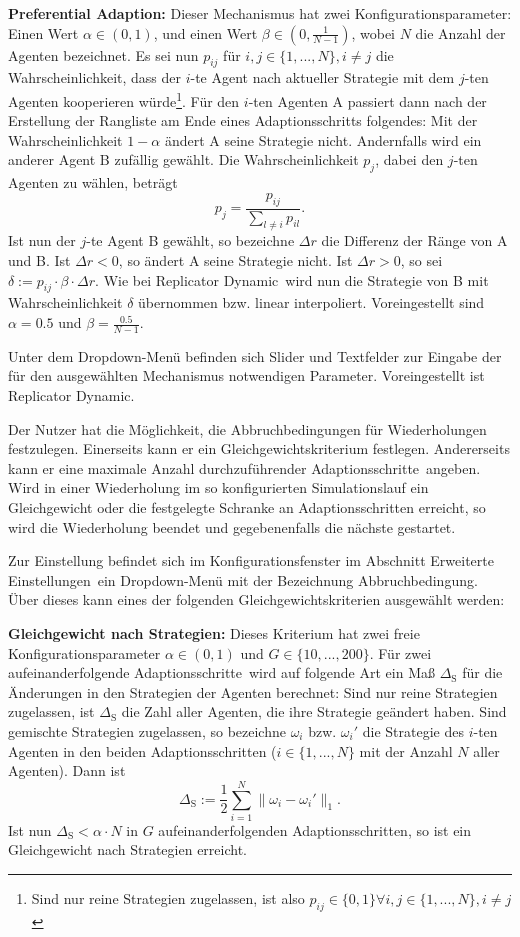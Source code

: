 \documentclass[parskip=full,11pt]{scrartcl}
\def\adapt{Adaptionsschritt}
\def\adapts{Adaptionsschritte}
\begin{document}
\textbf{Preferential Adaption:}
Dieser Mechanismus hat zwei Konfigurationsparameter: Einen Wert \(\alpha \in (0,1)\), und einen Wert \(\beta \in (0,\frac{1}{N-1})\), wobei \(N\) die Anzahl der Agenten bezeichnet. Es sei nun \(p_{ij}\) für \(i,j \in \{1,...,N\}, i \neq j\) die Wahrscheinlichkeit, dass der \(i\)-te Agent nach aktueller Strategie mit dem \(j\)-ten Agenten kooperieren würde\footnote{Sind nur reine Strategien zugelassen, ist also \(p_{ij} \in \{0,1\} \forall i,j \in \{1,...,N\}, i \neq j\)}. Für den \(i\)-ten Agenten A passiert dann nach der Erstellung der Rangliste am Ende eines \adapt s folgendes: Mit der Wahrscheinlichkeit \(1 - \alpha\) ändert A seine Strategie nicht. Andernfalls wird ein anderer Agent B zufällig gewählt. Die Wahrscheinlichkeit \(p_j\), dabei den \(j\)-ten Agenten zu wählen, beträgt
\[
p_j = \frac{p_{ij}}{\sum_{l \neq i} p_{il}}.
\]
Ist nun der \(j\)-te Agent B gewählt, so bezeichne \(\Delta r\) die Differenz der Ränge von A und B. Ist \(\Delta r < 0\), so ändert A seine Strategie nicht. Ist \(\Delta r > 0\), so sei \(\delta := p_{ij} \cdot \beta \cdot \Delta r\). Wie bei \glqq Replicator Dynamic\grqq\ wird nun die Strategie von B mit Wahrscheinlichkeit \(\delta\) übernommen bzw. linear interpoliert. Voreingestellt sind \(\alpha = 0.5\) und \(\beta = \frac{0.5}{N - 1}\).

Unter dem Dropdown-Menü befinden sich Slider und Textfelder zur Eingabe der für den ausgewählten Mechanismus notwendigen Parameter. Voreingestellt ist \glqq Replicator Dynamic\grqq.

Der Nutzer hat die Möglichkeit, die Abbruchbedingungen für Wiederholungen festzulegen. Einerseits kann er ein Gleichgewichtskriterium festlegen. Andererseits kann er eine maximale Anzahl durchzuführender \adapts\ angeben. Wird in einer Wiederholung im so konfigurierten Simulationslauf ein Gleichgewicht oder die festgelegte Schranke an \adapts n erreicht, so wird die Wiederholung beendet und gegebenenfalls die nächste gestartet.

Zur Einstellung befindet sich im Konfigurationsfenster im Abschnitt \glqq Erweiterte Einstellungen\grqq\ ein Dropdown-Menü mit der Bezeichnung \glqq Abbruchbedingung\grqq. Über dieses kann eines der folgenden Gleichgewichtskriterien ausgewählt werden:

\textbf{Gleichgewicht nach Strategien:}
Dieses Kriterium hat zwei freie Konfigurationsparameter \(\alpha \in (0,1)\) und \(G \in \{10,...,200\}\). Für zwei aufeinanderfolgende \adapts\ wird auf folgende Art ein Maß \(\Delta_\text{S}\) für die Änderungen in den Strategien der Agenten berechnet: Sind nur reine Strategien zugelassen, ist \(\Delta_\text{S}\)  die Zahl aller Agenten, die ihre Strategie geändert haben. Sind gemischte Strategien zugelassen, so bezeichne \(\omega_i\) bzw. \(\omega_i'\) die Strategie des \(i\)-ten Agenten in den beiden \adapts n (\(i \in \{1,...,N\}\) mit der Anzahl \(N\) aller Agenten). Dann ist
\[
\Delta_\text{S} :=\frac 12 \sum_{i=1}^N \|\omega_i - \omega_i'\|_1.
\]
Ist nun \(\Delta_\text{S} < \alpha \cdot N\) in \(G\) aufeinanderfolgenden \adapts n, so ist ein Gleichgewicht nach Strategien erreicht.
\end{document}
